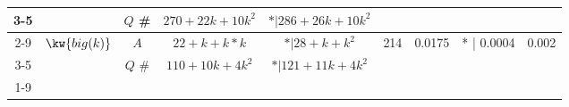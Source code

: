 \begin {table}[H]
\begin{center}
{\begin{tabular}{ | >{\tiny}c| r | >{\tiny}c | c | c | c | c | c | c | }
         \cline{3-5}
         & & $Q$ \#   & $270 + 22k + 10k^2 $ & $* | 286+26k+10k^2$  & & & & \\
         \cline{2-9}
         & \multirow{2}{*}{$\kw{big(k)}$} 
         & $A$ &  $22+k+k*k$  &  $* |28 + k + k^2 $ &  214 & 0.0175 & * | 0.0004 & 0.002 \\
         \cline{3-5}
         & & $Q$ \#   & $110+10k+4k^2$ & $* |121+11k+4k^2 $   & & & & \\
         \cline{1-9}
        \end{tabular}
}
\end{center}
\end{table}